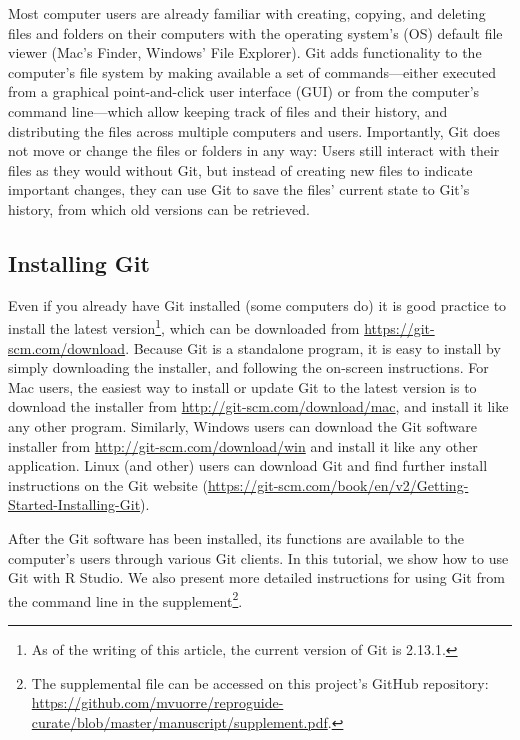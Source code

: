 \documentclass[
  american,
  ,doc,floatsintext]{apa6}
\begin{document}
Most computer users are already familiar with creating, copying, and deleting files and folders on their computers with the operating system's (OS) default file viewer (Mac's Finder, Windows' File Explorer). Git adds functionality to the computer's file system by making available a set of commands---either executed from a graphical point-and-click user interface (GUI) or from the computer's command line---which allow keeping track of files and their history, and distributing the files across multiple computers and users. Importantly, Git does not move or change the files or folders in any way: Users still interact with their files as they would without Git, but instead of creating new files to indicate important changes, they can use Git to save the files' current state to Git's history, from which old versions can be retrieved.

\hypertarget{installing-git}{%
\subsection{Installing Git}\label{installing-git}}

Even if you already have Git installed (some computers do) it is good practice to install the latest version\footnote{As of the writing of this article, the current version of Git is 2.13.1.}, which can be downloaded from \url{https://git-scm.com/download}. Because Git is a standalone program, it is easy to install by simply downloading the installer, and following the on-screen instructions. For Mac users, the easiest way to install or update Git to the latest version is to download the installer from \url{http://git-scm.com/download/mac}, and install it like any other program. Similarly, Windows users can download the Git software installer from \url{http://git-scm.com/download/win} and install it like any other application. Linux (and other) users can download Git and find further install instructions on the Git website (\url{https://git-scm.com/book/en/v2/Getting-Started-Installing-Git}).

After the Git software has been installed, its functions are available to the computer's users through various Git clients. In this tutorial, we show how to use Git with R Studio. We also present more detailed instructions for using Git from the command line in the supplement\footnote{The supplemental file can be accessed on this project's GitHub repository: \url{https://github.com/mvuorre/reproguide-curate/blob/master/manuscript/supplement.pdf}.}.
\end{document}
